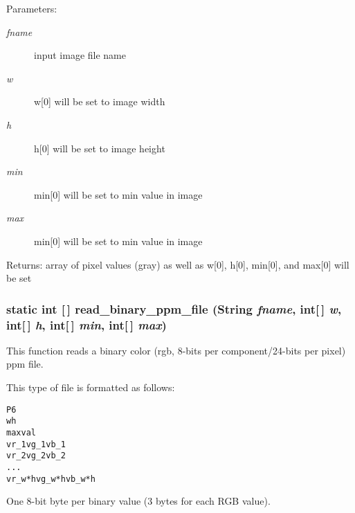 \begin{Desc}
\item[Parameters:]
\begin{description}
\item[{\em fname}]input image file name \item[{\em w}]w[0] will be set to image width \item[{\em h}]h[0] will be set to image height \item[{\em min}]min[0] will be set to min value in image \item[{\em max}]min[0] will be set to min value in image\end{description}
\end{Desc}
\begin{Desc}
\item[Returns:]array of pixel values (gray) as well as w[0], h[0], min[0], and max[0] will be set \end{Desc}
\subsubsection{\setlength{\rightskip}{0pt plus 5cm}static int [$\,$] read\_\-binary\_\-ppm\_\-file (String {\em fname}, int[$\,$] {\em w}, int[$\,$] {\em h}, int[$\,$] {\em min}, int[$\,$] {\em max})\hspace{0.3cm}{\tt  [static, protected]}}\label{class_c_s_image_viewer_1_1pnm_helper_aac77a4848c332712dd805d33b9d815b}


This function reads a binary color (rgb, 8-bits per component/24-bits per pixel) ppm file. 

This type of file is formatted as follows: \small\begin{alltt}
    P6
    w h
    maxval
    vr\_1 vg\_1 vb\_1 
    vr\_2 vg\_2 vb\_2
    . . .
    vr\_w*h vg\_w*h vb\_w*h
  \end{alltt}\normalsize 
 One 8-bit byte per binary value (3 bytes for each RGB value).

